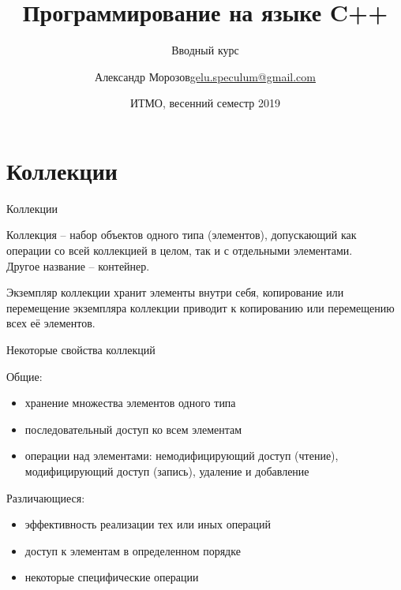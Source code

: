 \documentclass[unknownkeysallowed,xcolor=table]{beamer}
\title[C++]
{Программирование на языке C++}
\subtitle{Вводный курс}
\author[А.~Б.~Морозов]
{
  \texorpdfstring{Александр Морозов\newline\href{mailto:gelu.speculum@gmail.com}{gelu.speculum@gmail.com}}
  {Александр Морозов}
}
\date[ITMO 2019]
{ИТМО, весенний семестр 2019}
\begin{document}
\frame{\titlepage}


\section{Коллекции}

\begin{frame}{Коллекции}

Коллекция -- набор объектов одного типа (элементов), допускающий как операции со всей коллекцией в целом, так и с отдельными элементами. \\
Другое название -- контейнер.

\vspace{2em}

Экземпляр коллекции хранит элементы внутри себя, копирование или перемещение экземпляра коллекции приводит к копированию или перемещению всех её элементов.

\end{frame}

\begin{frame}{Некоторые свойства коллекций}

Общие:

\vspace{0.5em}

\begin{itemize}
  \item хранение множества элементов одного типа \vspace{0.5em}
  \item последовательный доступ ко всем элементам \vspace{0.5em}
  \item операции над элементами: немодифицирующий доступ (чтение), модифицирующий доступ (запись), удаление и добавление
\end{itemize}

\vspace{1em}

Различающиеся:

\vspace{0.5em}

\begin{itemize}
  \item эффективность реализации тех или иных операций \vspace{0.5em}
  \item доступ к элементам в определенном порядке \vspace{0.5em}
  \item некоторые специфические операции
\end{itemize}

\end{frame}
\end{document}
